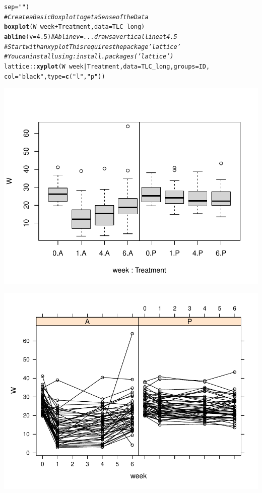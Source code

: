 \documentclass[oneside]{book}\usepackage[]{graphicx}\usepackage[svgnames]{xcolor}
\makeatletter
\def\maxwidth{ %
  \ifdim\Gin@nat@width>\linewidth
    \linewidth
  \else
    \Gin@nat@width
  \fi
}
\newcommand{\hlnum}[1]{\textcolor[rgb]{0.686,0.059,0.569}{#1}}%
\newcommand{\hlstr}[1]{\textcolor[rgb]{0.192,0.494,0.8}{#1}}%
\newcommand{\hlcom}[1]{\textcolor[rgb]{0.678,0.584,0.686}{\textit{#1}}}%
\newcommand{\hlopt}[1]{\textcolor[rgb]{0,0,0}{#1}}%
\newcommand{\hlstd}[1]{\textcolor[rgb]{0.345,0.345,0.345}{#1}}%
\newcommand{\hlkwc}[1]{\textcolor[rgb]{0.333,0.667,0.333}{#1}}%
\newcommand{\hlkwd}[1]{\textcolor[rgb]{0.737,0.353,0.396}{\textbf{#1}}}%
\newenvironment{kframe}{%
 \def\at@end@of@kframe{}%
 \ifinner\ifhmode%
  \def\at@end@of@kframe{\end{minipage}}%
  \begin{minipage}{\columnwidth}%
 \fi\fi%
 \def\FrameCommand##1{\hskip\@totalleftmargin \hskip-\fboxsep
 \colorbox{shadecolor}{##1}\hskip-\fboxsep
     \hskip-\linewidth \hskip-\@totalleftmargin \hskip\columnwidth}%
 \MakeFramed {\advance\hsize-\width
   \@totalleftmargin\z@ \linewidth\hsize
   \@setminipage}}%
 {\par\unskip\endMakeFramed%
 \at@end@of@kframe}
\newenvironment{knitrout}{}{} %
\makeatother
\begin{document}
\begin{knitrout}
\begin{kframe}
\begin{alltt}
  \hlkwc{sep} \hlstd{=} \hlstr{""}\hlstd{)}
\hlcom{# Create a Basic Boxplot to get a Sense of the Data}
\hlkwd{boxplot}\hlstd{(W} \hlopt{~} \hlstd{week} \hlopt{+} \hlstd{Treatment,} \hlkwc{data} \hlstd{= TLC_long)}
\hlkwd{abline}\hlstd{(}\hlkwc{v} \hlstd{=} \hlnum{4.5}\hlstd{)}  \hlcom{# Abline v=... draws a vertical line at 4.5 }
\hlcom{# Start with an xyplot This requires the package 'lattice'}
\hlcom{# You can install using: install.packages('lattice')}
\hlstd{lattice}\hlopt{::}\hlkwd{xyplot}\hlstd{(W} \hlopt{~} \hlstd{week} \hlopt{|} \hlstd{Treatment,} \hlkwc{data} \hlstd{= TLC_long,} \hlkwc{groups} \hlstd{= ID,}
  \hlkwc{col} \hlstd{=} \hlstr{"black"}\hlstd{,} \hlkwc{type} \hlstd{=} \hlkwd{c}\hlstd{(}\hlstr{"l"}\hlstd{,} \hlstr{"p"}\hlstd{))}
\end{alltt}
\end{kframe}

{\centering \includegraphics[width=\maxwidth]{figure/unnamed-chunk-3-1} 

}




{\centering \includegraphics[width=\maxwidth]{figure/unnamed-chunk-3-2} 

}
\end{knitrout}
\end{document}
